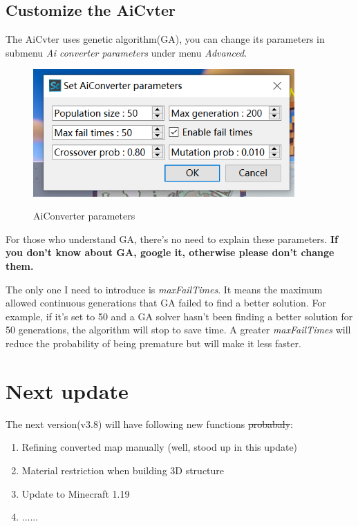 \documentclass{article}
\begin{document}
    \subsection{Customize the AiCvter}
    \label{CustomizeAiCvter}
    The AiCvter uses genetic algorithm(GA), you can change its parameters in submenu \textit{Ai converter parameters} under menu \textit{Advanced}.

    \begin{figure}[htbp]
        \centering
        \includegraphics[width=10cm]{Img13_AiCvterPara.png}
        \label{GAOpt}
        \caption{AiConverter parameters}
    \end{figure}

    For those who understand GA, there's no need to explain these parameters. \textbf{If you don't know about GA, google it, otherwise please don't change them.}

    The only one I need to introduce is \textit{maxFailTimes}. It means the maximum allowed continuous generations that GA failed to find a better solution. For example, if it's set to 50 and a GA solver hasn't been finding a better solution for 50 generations, the algorithm will stop to save time. A greater \textit{maxFailTimes} will reduce the probability of being premature but will make it less faster.

    
\pagebreak
\section{Next update}
    The next version(v3.8) will have following new functions \st{probabaly}:
    \begin{enumerate}
        \item Refining converted map manually (well, stood up in this update)
        \item Material restriction when building 3D structure
        \item Update to Minecraft 1.19
        \item ......
    \end{enumerate}
\end{document}
